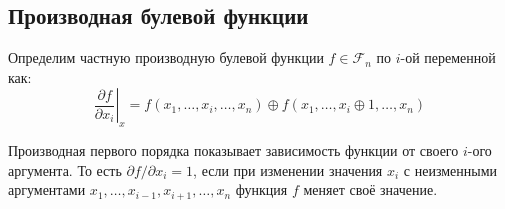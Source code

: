 \subsection{Производная булевой функции}
Определим частную производную булевой функции $f \in \mathcal{F}_n$ по $i$-ой переменной как:
\begin{equation}
    \left . \frac{\partial f}{\partial x_i} \right|_{x} = f(x_1,\dots, x_i, \dots, x_n) \oplus f(x_1,\dots, x_i \oplus 1, \dots, x_n) \label{7}
\end{equation}

Производная первого порядка показывает зависимость функции от своего $i$-ого аргумента. То есть $\partial f / \partial x_i = 1 $, если при изменении значения $x_i$ с неизменными аргументами $x_1, \dots, x_{i-1}, x_{i+1}, \dots, x_n$ функция $f$ меняет своё значение.

